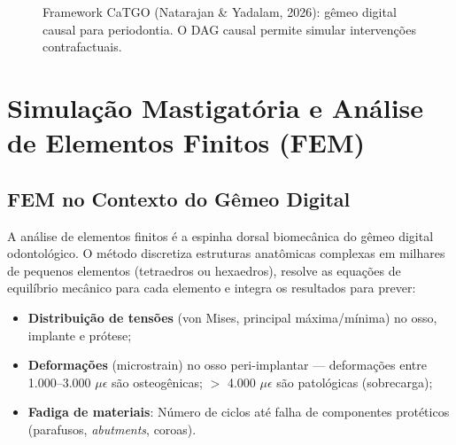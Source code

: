 \begin{figure}[H]
\centering
{}
\caption{Framework CaTGO (Natarajan \& Yadalam, 2026): gêmeo digital causal para periodontia. O DAG causal permite simular intervenções contrafactuais.}
\label{fig:catgo}
\end{figure}

\section{Simulação Mastigatória e Análise de Elementos Finitos (FEM)}

\subsection{FEM no Contexto do Gêmeo Digital}

A análise de elementos finitos é a espinha dorsal biomecânica do gêmeo digital odontológico. O método discretiza estruturas anatômicas complexas em milhares de pequenos elementos (tetraedros ou hexaedros), resolve as equações de equilíbrio mecânico para cada elemento e integra os resultados para prever:
\begin{itemize}
    \item \textbf{Distribuição de tensões} (von Mises, principal máxima/mínima) no osso, implante e prótese;
    \item \textbf{Deformações} (microstrain) no osso peri-implantar --- deformações entre 1.000--3.000 $\mu\epsilon$ são osteogênicas; $>$ 4.000 $\mu\epsilon$ são patológicas (sobrecarga);
    \item \textbf{Fadiga de materiais}: Número de ciclos até falha de componentes protéticos (parafusos, \textit{abutments}, coroas).
\end{itemize}

